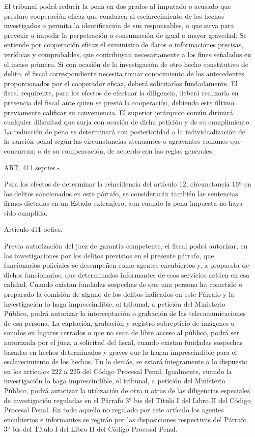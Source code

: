     El tribunal podrá reducir la pena en dos grados al imputado o acusado que prestare cooperación eficaz que conduzca al esclarecimiento de los hechos investigados o permita la identificación de sus responsables, o que sirva para prevenir o impedir la perpetración o consumación de igual o mayor gravedad.
    Se entiende por cooperación eficaz el suministro de datos o informaciones precisas, verídicas y comprobables, que contribuyan necesariamente a los fines señalados en el inciso primero.
    Si con ocasión de la investigación de otro hecho constitutivo de delito, el fiscal correspondiente necesita tomar conocimiento de los antecedentes proporcionados por el cooperador eficaz, deberá solicitarlos fundadamente. El fiscal requirente, para los efectos de efectuar la diligencia, deberá realizarla en presencia del fiscal ante quien se prestó la cooperación, debiendo este último previamente calificar su conveniencia. El superior jerárquico común dirimirá cualquier dificultad que surja con ocasión de dicha petición y de su cumplimiento.
    La reducción de pena se determinará con posterioridad a la individualización de la sanción penal según las circunstancias atenuantes o agravantes comunes que concurran; o de su compensación, de acuerdo con las reglas generales.


    ART. 411 septies.-

    Para los efectos de determinar la reincidencia del artículo 12, circunstancia 16ª en los delitos sancionados en este párrafo, se considerarán también las sentencias firmes dictadas en un Estado extranjero, aun cuando la pena impuesta no haya sido cumplida.


    Artículo 411 octies.-

    Previa autorización del juez de garantía competente, el fiscal podrá autorizar, en las investigaciones por los delitos previstos en el presente párrafo, que funcionarios policiales se desempeñen como agentes encubiertos y, a propuesta de dichos funcionarios, que determinados informantes de esos servicios actúen en esa calidad.
    Cuando existan fundadas sospechas de que una persona ha cometido o preparado la comisión de alguno de los delitos indicados en este Párrafo y la investigación lo haga imprescindible, el tribunal, a petición del Ministerio Público, podrá autorizar la interceptación o grabación de las telecomunicaciones de esa persona. La captación, grabación y registro subrepticio de imágenes o sonidos en lugares cerrados o que no sean de libre acceso al público, podrá ser autorizada por el juez, a solicitud del fiscal, cuando existan fundadas sospechas basadas en hechos determinados y graves que lo hagan imprescindible para el esclarecimiento de los hechos. En lo demás, se estará íntegramente a lo dispuesto en los artículos 222 a 225 del Código Procesal Penal.
    Igualmente, cuando la investigación lo haga imprescindible, el tribunal, a petición del Ministerio Público, podrá autorizar la utilización de otra u otras de las diligencias especiales de investigación reguladas en el Párrafo 3° bis del Título I del Libro II del Código Procesal Penal.
    En todo aquello no regulado por este artículo los agentes encubiertos e informantes se regirán por las disposiciones respectivas del Párrafo 3° bis del Título I del Libro II del Código Procesal Penal.

